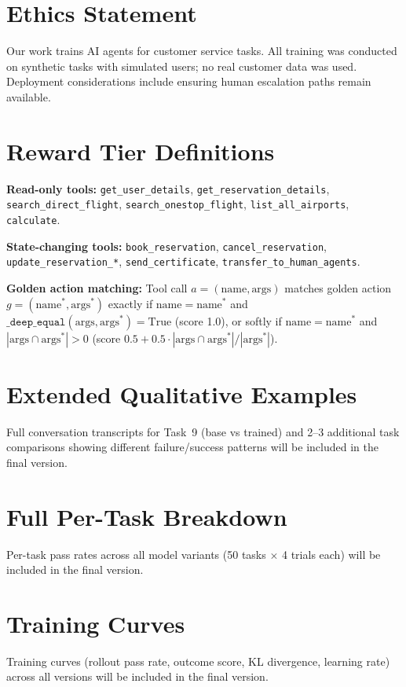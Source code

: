 \documentclass[11pt]{article}
\begin{document}
\section*{Ethics Statement}

Our work trains AI agents for customer service tasks. All training was conducted on synthetic tasks with simulated users; no real customer data was used. Deployment considerations include ensuring human escalation paths remain available.



\appendix

\section{Reward Tier Definitions}
\label{app:reward_tiers}

\textbf{Read-only tools:} \texttt{get\_user\_details}, \texttt{get\_reservation\_details}, \texttt{search\_direct\_flight}, \texttt{search\_onestop\_flight}, \texttt{list\_all\_airports}, \texttt{calculate}.

\textbf{State-changing tools:} \texttt{book\_reservation}, \texttt{cancel\_reservation}, \texttt{update\_reservation\_*}, \texttt{send\_certificate}, \texttt{transfer\_to\_human\_agents}.

\textbf{Golden action matching:} Tool call $a = (\text{name}, \text{args})$ matches golden action $g = (\text{name}^*, \text{args}^*)$ exactly if $\text{name} = \text{name}^*$ and $\texttt{\_deep\_equal}(\text{args}, \text{args}^*) = \text{True}$ (score 1.0), or softly if $\text{name} = \text{name}^*$ and $|\text{args} \cap \text{args}^*| > 0$ (score $0.5 + 0.5 \cdot |\text{args} \cap \text{args}^*| / |\text{args}^*|$).

\section{Extended Qualitative Examples}
\label{app:examples}

Full conversation transcripts for Task~9 (base vs trained) and 2--3 additional task comparisons showing different failure/success patterns will be included in the final version.

\section{Full Per-Task Breakdown}
\label{app:tasks}

Per-task pass rates across all model variants (50 tasks $\times$ 4 trials each) will be included in the final version.

\section{Training Curves}
\label{app:curves}

Training curves (rollout pass rate, outcome score, KL divergence, learning rate) across all versions will be included in the final version.
\end{document}
